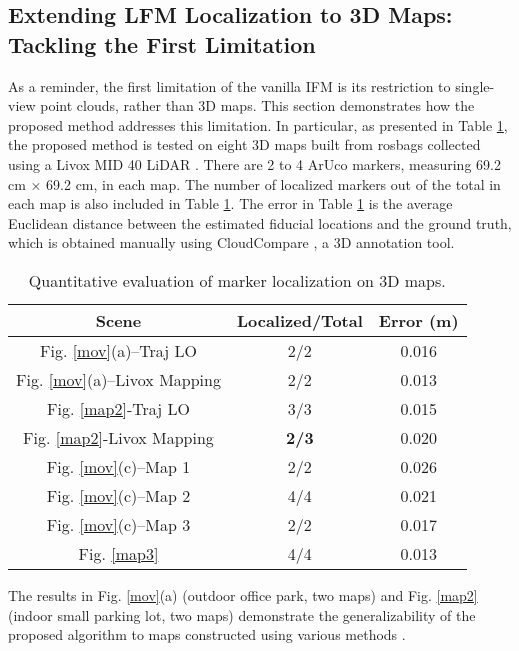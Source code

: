 \subsection{Extending LFM Localization to 3D Maps:\\ Tackling the First Limitation} \label{321}
As a reminder, the first limitation of the vanilla IFM is its restriction to single-view point clouds, rather than 3D maps. This section demonstrates how the proposed method addresses this limitation.
%
In particular, as presented in Table \ref{imtab1}, the proposed method is tested on eight 3D maps built from rosbags collected using a Livox MID 40 LiDAR \cite{sdk}. There are 2 to 4 ArUco markers, measuring 69.2 cm × 69.2 cm, in each map. The number of localized markers out of the total in each map is also included in Table \ref{imtab1}. The error in Table \ref{imtab1} is the average Euclidean distance between the estimated fiducial locations and the ground truth, which is obtained manually using CloudCompare \cite{cloudcompare}, a 3D annotation tool. 
\begin{table}[H]
\caption{Quantitative evaluation of marker localization on 3D maps. }
	\centering
 
	\begin{center}
		\begin{tabular}{c|c|c}
			\hline \hline
				Scene & Localized/Total & Error (m) \\ \hline
    Fig. \ref{mov}(a)--Traj LO \cite{traj} & 2/2 & 0.016 \\ \hline
   Fig. \ref{mov}(a)--Livox Mapping \cite{sdk} & 2/2 & 0.013 \\ 
 \hline
   Fig. \ref{map2}-Traj LO \cite{traj} & 3/3 & 0.015  \\ \hline
   Fig. \ref{map2}-Livox Mapping \cite{sdk} & \textbf{2/3} & 0.020  \\ \hline 
Fig. \ref{mov}(c)--Map 1 & 2/2 & 0.026 \\ \hline
Fig. \ref{mov}(c)--Map 2 & 4/4 & 0.021 \\ \hline
Fig. \ref{mov}(c)--Map 3 & 2/2 & 0.017 \\
\hline
 Fig. \ref{map3} & 4/4 & 0.013
 \\ \hline \hline
			
		\end{tabular}
	\end{center}
		\label{imtab1}
\end{table} \par
The results in Fig. \ref{mov}(a) (outdoor office park, two maps) and Fig. \ref{map2} (indoor small parking lot, two maps) demonstrate the generalizability of the proposed algorithm to maps constructed using various methods \cite{traj,sdk}. 
